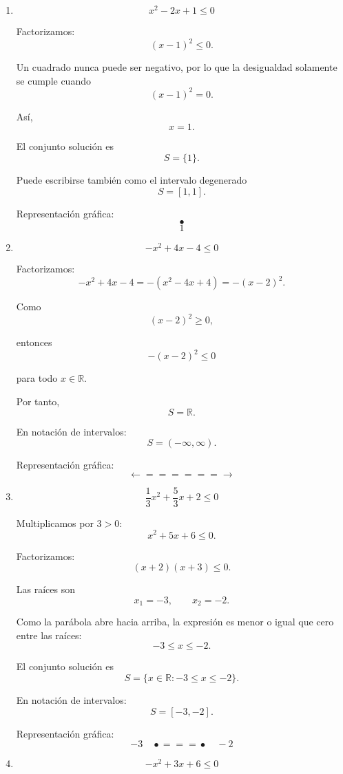 \documentclass[12pt]{article}
\begin{document}
{\begin{enumerate}
\item
\[
x^2-2x+1\leq0
\]

Factorizamos:
\[
(x-1)^2\leq0.
\]

Un cuadrado nunca puede ser negativo, por lo que la desigualdad solamente
se cumple cuando
\[
(x-1)^2=0.
\]

Así,
\[
x=1.
\]

El conjunto solución es
\[
\boxed{
S=\{1\}.
}
\]

Puede escribirse también como el intervalo degenerado
\[
\boxed{
S=[1,1].
}
\]

Representación gráfica:
\[
\bullet
\]
\[
1
\]

\item
\[
-x^2+4x-4\leq0
\]

Factorizamos:
\[
-x^2+4x-4
=
-(x^2-4x+4)
=
-(x-2)^2.
\]

Como
\[
(x-2)^2\geq0,
\]

entonces
\[
-(x-2)^2\leq0
\]

para todo \(x\in\mathbb{R}\).

Por tanto,
\[
\boxed{
S=\mathbb{R}.
}
\]

En notación de intervalos:
\[
\boxed{
S=(-\infty,\infty).
}
\]

Representación gráfica:
\[
\longleftarrow\!\!=\!\!=\!\!=\!\!=\!\!=\!\!=\!\longrightarrow
\]

\item
\[
\frac{1}{3}x^2+\frac{5}{3}x+2\leq0
\]

Multiplicamos por \(3>0\):
\[
x^2+5x+6\leq0.
\]

Factorizamos:
\[
(x+2)(x+3)\leq0.
\]

Las raíces son
\[
x_1=-3,
\qquad
x_2=-2.
\]

Como la parábola abre hacia arriba, la expresión es menor o igual que
cero entre las raíces:
\[
-3\leq x\leq-2.
\]

El conjunto solución es
\[
\boxed{
S=
\{x\in\mathbb{R}:-3\leq x\leq-2\}.
}
\]

En notación de intervalos:
\[
\boxed{
S=[-3,-2].
}
\]

Representación gráfica:
\[
-3\quad
\bullet\!\!=\!\!=\!\!=\!\bullet
\quad-2
\]

\item
\[
-x^2+3x+6\leq0
\]


\end{enumerate}}
\end{document}
